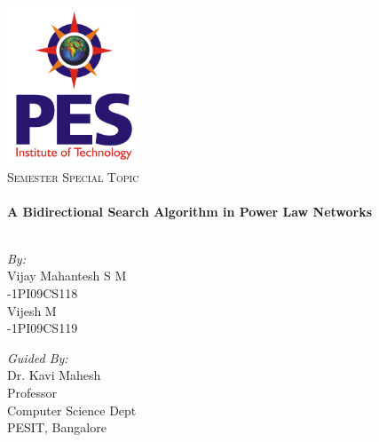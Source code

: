 
\begin{titlepage}
\begin{center}
\newpage

\includegraphics[width=0.3\textwidth]{./logo}\\[2cm]    

\textsc{\Large  {} Semester Special Topic}\\[0.5cm]

\HRule \\[0.4cm]
{ \huge \bfseries A Bidirectional Search Algorithm in Power Law Networks}\\[0.4cm]
\HRule \\[1.5cm]

\vspace{1in}

\begin{minipage}{0.4\textwidth}
\begin{flushleft} \large
\emph{By:}\\
Vijay Mahantesh S M\\
-1PI09CS118\\
Vijesh M\\
-1PI09CS119
\end{flushleft}
\end{minipage}
\begin{minipage}{0.4\textwidth}
\begin{flushright} \large
\emph{Guided By:} \\
Dr. Kavi Mahesh\\
Professor \\
Computer Science Dept\\
PESIT, Bangalore 
\end{flushright}
\end{minipage}

\end{center}
\end{titlepage}
